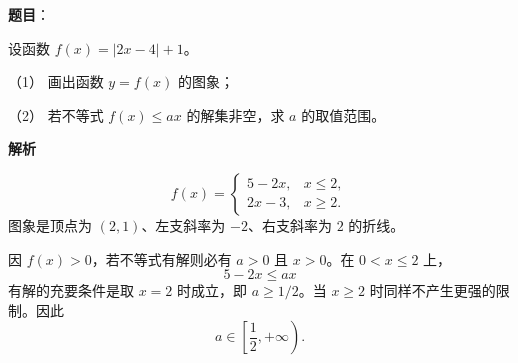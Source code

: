 \begin{answer}

\textbf{题目}：

设函数 $f(x)=|2x-4|+1$。

（1） 画出函数 $y=f(x)$ 的图象；

（2） 若不等式 $f(x)\leq ax$ 的解集非空，求 $a$ 的取值范围。
\nopagebreak[4]
\begin{center}\end{center}
\nopagebreak[4]
\textbf{解析}


\nopagebreak[4]
\[
f(x)=\begin{cases}5-2x,&x\leq2,\\2x-3,&x\geq2.
\end{cases}
\]
图象是顶点为 $(2,1)$、左支斜率为 $-2$、右支斜率为 $2$ 的折线。


因 $f(x)>0$，若不等式有解则必有 $a>0$ 且 $x>0$。在 $0<x\leq2$ 上，
\nopagebreak[4]
\[
5-2x\leq ax
\]
有解的充要条件是取 $x=2$ 时成立，即 $a\geq1/2$。当 $x\geq2$ 时同样不产生更强的限制。因此
\nopagebreak[4]
\[
a\in\left[\frac12,+\infty\right).
\]


\gkanswer{答案（2）：$a\in\left[\dfrac12,+\infty\right)$。}

\end{answer}